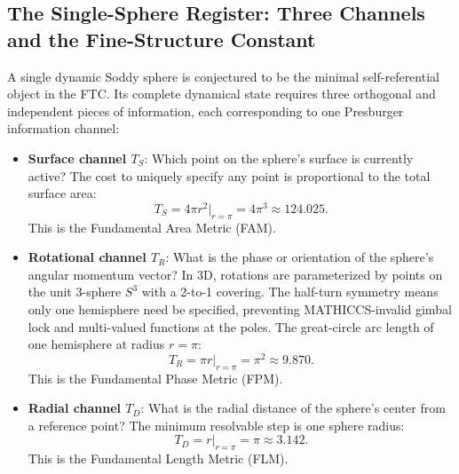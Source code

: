 \documentclass[11pt,a4paper]{article}
\begin{document}
\subsection{The Single-Sphere Register: Three Channels and the Fine-Structure Constant}

A single dynamic Soddy sphere is conjectured to be the minimal self-referential object in the FTC. Its complete dynamical state requires three orthogonal and independent pieces of information, each corresponding to one Presburger information channel:

\begin{itemize}
  \item \textbf{Surface channel $T_S$}: Which point on the sphere's surface is currently active? The cost to uniquely specify any point is proportional to the total surface area:
    \[
      T_S = 4\pi r^2 \big|_{r=\pi} = 4\pi^3 \approx 124.025.
    \]
    This is the Fundamental Area Metric (FAM).
  \item \textbf{Rotational channel $T_R$}: What is the phase or orientation of the sphere's angular momentum vector? In 3D, rotations are parameterized by points on the unit 3-sphere $S^3$ with a 2-to-1 covering. The half-turn symmetry means only one hemisphere need be specified, preventing MATHICCS-invalid gimbal lock and multi-valued functions at the poles. The great-circle arc length of one hemisphere at radius $r=\pi$:
    \[
      T_R = \pi r \big|_{r=\pi} = \pi^2 \approx 9.870.
    \]
    This is the Fundamental Phase Metric (FPM).
  \item \textbf{Radial channel $T_D$}: What is the radial distance of the sphere's center from a reference point? The minimum resolvable step is one sphere radius:
    \[
      T_D = r \big|_{r=\pi} = \pi \approx 3.142.
    \]
    This is the Fundamental Length Metric (FLM).
\end{itemize}
\end{document}
